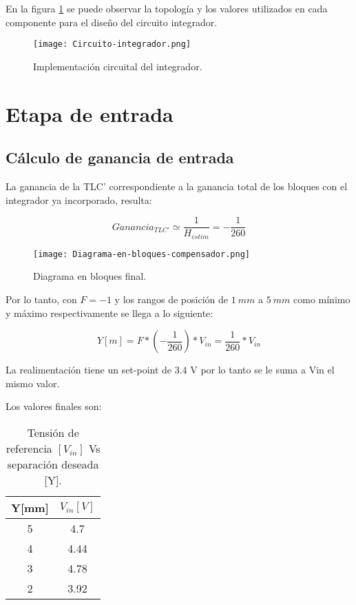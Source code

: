 \noindent En la figura \ref{fig:circuito-integrador} se puede observar la topología y los valores utilizados en cada componente para el diseño del circuito integrador. 

\begin{figure}[H]
	\centering
	\texttt{[image: Circuito-integrador.png]}
	\caption{Implementación circuital del integrador.}
	\label{fig:circuito-integrador}
	\end{figure}
\section{Etapa de entrada}
\subsection{Cálculo de ganancia de entrada}

\noindent La ganancia de la TLC' correspondiente a la ganancia total de los bloques con el integrador ya incorporado, resulta:

\begin{equation} 
	Ganancia_{TLC'} \simeq \frac{1}{H_{estim}} = - \frac{1}{260}
\end{equation}

\begin{figure}[H]
	\centering
	\texttt{[image: Diagrama-en-bloques-compensador.png]}
	\caption{Diagrama en bloques final.}
	\label{fig:diag-bloques-compensador}
\end{figure}

\noindent Por lo tanto, con $F=-1$ y los rangos de posición de $1\:mm$ a $5\:mm$ como mínimo y máximo respectivamente se llega a lo siguiente:

\begin{equation} 
	Y[m] = F * (-\frac{1}{260})*V_{in} =\frac{1}{260}*V_{in} 
\end{equation}

\noindent La realimentación tiene un set-point de 3.4 V por lo tanto se le suma a Vin el mismo valor.

\noindent Los valores finales son:


\begin{table}[H]
	\begin{center}
		\begin{tabular}{| c | c |}
			\hline
			Y[mm] & $V_{in}[V]$\\ \hline
			5 & 4.7\\ \hline
			4 & 4.44 \\ \hline
			3 & 4.78\\ \hline
			2 &	3.92 \\ \hline		
		\end{tabular}
		\caption{Tensión de referencia $[V_{in}]$ Vs separación deseada [Y].}
		\label{tension-ref-vs-separacion-deseada}
	\end{center}
\end{table}

